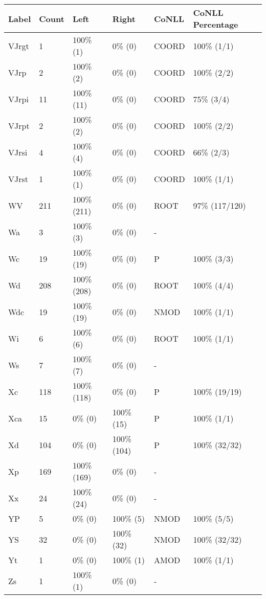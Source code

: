 \begin{figure*}
\begin{tabular}{|l|l|l|l||l|l|}
\hline
Label & Count & Left & Right & CoNLL & CoNLL Percentage\\ 
\hline
 VJrgt & 1 & 100\% (1) & 0\% (0) & COORD & 100\% (1/1) \\ 
\hline
 VJrp & 2 & 100\% (2) & 0\% (0) & COORD & 100\% (2/2) \\ 
\hline
 VJrpi & 11 & 100\% (11) & 0\% (0) & COORD & 75\% (3/4) \\ 
\hline
 VJrpt & 2 & 100\% (2) & 0\% (0) & COORD & 100\% (2/2) \\ 
\hline
 VJrsi & 4 & 100\% (4) & 0\% (0) & COORD & 66\% (2/3) \\ 
\hline
 VJrst & 1 & 100\% (1) & 0\% (0) & COORD & 100\% (1/1) \\ 
\hline
 WV & 211 & 100\% (211) & 0\% (0) & ROOT & 97\% (117/120) \\ 
\hline
 Wa & 3 & 100\% (3) & 0\% (0) & - &  \\ 
\hline
 Wc & 19 & 100\% (19) & 0\% (0) & P & 100\% (3/3) \\ 
\hline
 Wd & 208 & 100\% (208) & 0\% (0) & ROOT & 100\% (4/4) \\ 
\hline
 Wdc & 19 & 100\% (19) & 0\% (0) & NMOD & 100\% (1/1) \\ 
\hline
 Wi & 6 & 100\% (6) & 0\% (0) & ROOT & 100\% (1/1) \\ 
\hline
 Ws & 7 & 100\% (7) & 0\% (0) & - &  \\ 
\hline
 Xc & 118 & 100\% (118) & 0\% (0) & P & 100\% (19/19) \\ 
\hline
 Xca & 15 & 0\% (0) & 100\% (15) & P & 100\% (1/1) \\ 
\hline
 Xd & 104 & 0\% (0) & 100\% (104) & P & 100\% (32/32) \\ 
\hline
 Xp & 169 & 100\% (169) & 0\% (0) & - &  \\ 
\hline
 Xx & 24 & 100\% (24) & 0\% (0) & - &  \\ 
\hline
 YP & 5 & 0\% (0) & 100\% (5) & NMOD & 100\% (5/5) \\ 
\hline
 YS & 32 & 0\% (0) & 100\% (32) & NMOD & 100\% (32/32) \\ 
\hline
 Yt & 1 & 0\% (0) & 100\% (1) & AMOD & 100\% (1/1) \\ 
\hline
 Zs & 1 & 100\% (1) & 0\% (0) & - &  \\ 
\hline
\end{tabular}
\end{figure*}
